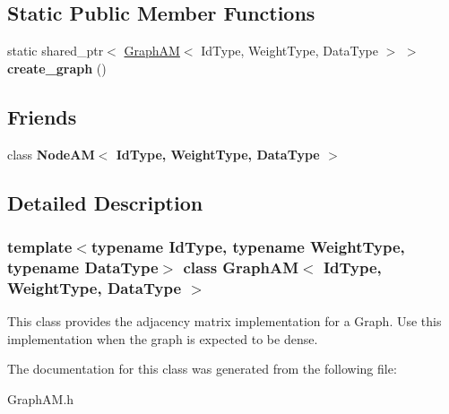 \subsection*{Static Public Member Functions}
\begin{DoxyCompactItemize}
\item 
\mbox{\label{class_graph_a_m_a7c1ee04a0c003ce686d0affdb7d848a8}} 
static shared\+\_\+ptr$<$ \hyperlink{class_graph_a_m}{Graph\+AM}$<$ Id\+Type, Weight\+Type, Data\+Type $>$ $>$ {\bfseries create\+\_\+graph} ()
\end{DoxyCompactItemize}
\subsection*{Friends}
\begin{DoxyCompactItemize}
\item 
\mbox{\label{class_graph_a_m_a76367132ae9d07dfd136a2e0fe948a39}} 
class {\bfseries Node\+A\+M$<$ Id\+Type, Weight\+Type, Data\+Type $>$}
\end{DoxyCompactItemize}


\subsection{Detailed Description}
\subsubsection*{template$<$typename Id\+Type, typename Weight\+Type, typename Data\+Type$>$\newline
class Graph\+A\+M$<$ Id\+Type, Weight\+Type, Data\+Type $>$}

This class provides the adjacency matrix implementation for a Graph. Use this implementation when the graph is expected to be dense. 

The documentation for this class was generated from the following file\+:\begin{DoxyCompactItemize}
\item 
Graph\+A\+M.\+h\end{DoxyCompactItemize}
